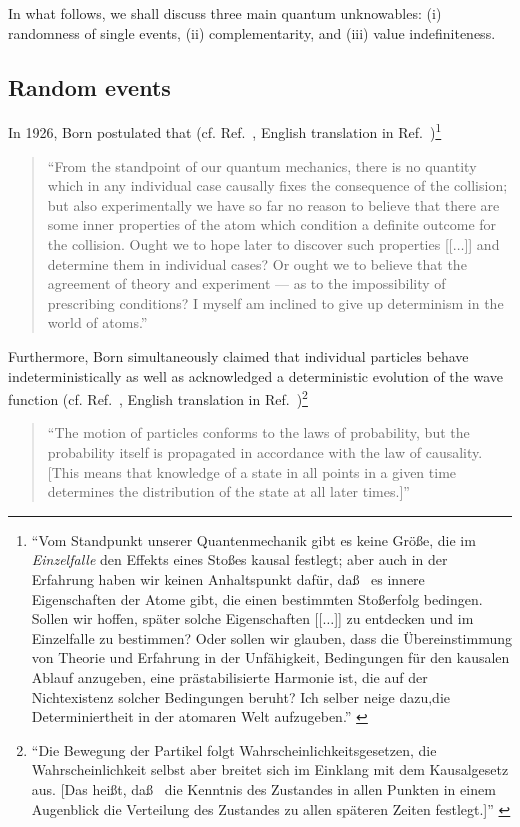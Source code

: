 \documentclass[rmp,amsfonts,showpacs,showkeys,twocolumn]{revtex4}
\begin{document}
In what follows, we shall discuss three main quantum unknowables:
(i) randomness of single events,
(ii) complementarity, and
(iii) value indefiniteness.

\subsection{Random events}

In 1926, Born postulated that (cf. Ref.~\cite[p.~866]{born-26-1}, English translation in Ref.~\cite[p.~54]{wheeler-Zurek:83})\footnote{
{ ``Vom Standpunkt unserer Quantenmechanik gibt es keine Gr\"o\ss e, die im {\em Einzelfalle} den Effekts eines Sto\ss es
kausal festlegt; aber auch in der Erfahrung haben wir keinen Anhaltspunkt daf\"ur, da\ss~ es innere Eigenschaften
der Atome gibt, die einen bestimmten Sto\ss erfolg bedingen.
Sollen wir hoffen, sp\"ater solche Eigenschaften
[[$\ldots$]] zu entdecken und im Einzelfalle zu bestimmen?
Oder sollen wir glauben, dass die \"Ubereinstimmung von Theorie und Erfahrung
in der Unf\"ahigkeit, Bedingungen f\"ur den kausalen Ablauf anzugeben, eine pr\"astabilisierte Harmonie ist,
die auf der Nichtexistenz solcher Bedingungen beruht?
Ich selber neige dazu,die Determiniertheit in der atomaren Welt aufzugeben.''
}
}
\begin{quote}
{  ``From the standpoint of our quantum mechanics, there is no quantity
which in any individual case causally fixes the consequence of the collision;
but also experimentally we have so far no reason to believe that there are some inner properties of the atom
which condition a definite outcome for the collision.
Ought we to hope later to discover such properties [[$\ldots$]]  and determine them in individual cases?
Or ought we to  believe that the agreement of theory and experiment --- as to the impossibility
of prescribing conditions? I myself am inclined  to give up determinism in the world of atoms.''
}
\end{quote}
Furthermore, Born simultaneously claimed that individual particles behave indeterministically
as well as acknowledged a deterministic evolution of the wave function
(cf. Ref.~\cite[p.~804]{born-26-2}, English translation in Ref.~\cite[p.~302]{jammer:89})\footnote{
{  ``Die Bewegung der Partikel folgt Wahrscheinlichkeitsgesetzen,
die Wahrscheinlichkeit selbst aber breitet sich im Einklang mit dem Kausalgesetz  aus.
[Das hei\ss t, da\ss~ die Kenntnis des Zustandes in allen Punkten in einem Augenblick
die Verteilung des Zustandes zu allen sp{\"a}teren Zeiten festlegt.]''
}
}
\begin{quote}
{  ``The motion of particles conforms to the laws of probability, but the probability itself
is propagated in accordance with the law of causality.
[This means that knowledge of a state in all points in a given time determines the distribution of
the state at all later times.]''
}
\end{quote}
\end{document}
